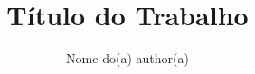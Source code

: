 \usepackage{titling}
\title{Título do Trabalho}
\author{Nome do(a) author(a)}
\newcommand{\fltitle}{Título do trabalho (em língua estrangeira)}
\newcommand{\advisor}{Titulação e nome do(a) orientador(a)}
\newcommand{\coadvisor}{Titulação e nome do(a) co-orientador(a)}
\renewcommand{\local}{Natal - RN}
\renewcommand{\date}{Data}
\newcommand{\approvaldate}{Data}
